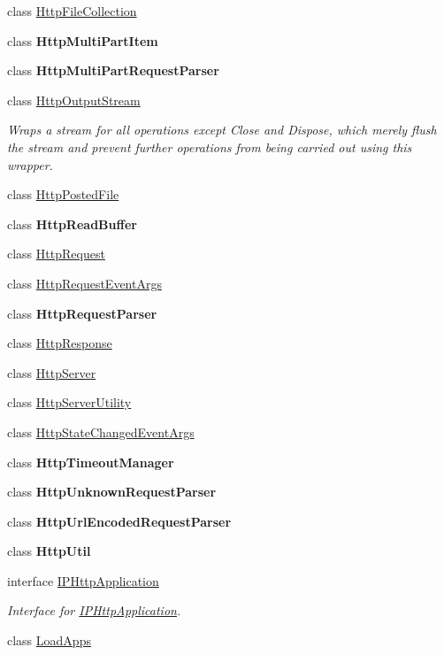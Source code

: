 \begin{DoxyCompactItemize}
class \hyperlink{class_p_http_1_1_http_file_collection}{Http\+File\+Collection}
\item 
class {\bfseries Http\+Multi\+Part\+Item}
\item 
class {\bfseries Http\+Multi\+Part\+Request\+Parser}
\item 
class \hyperlink{class_p_http_1_1_http_output_stream}{Http\+Output\+Stream}
\begin{DoxyCompactList}\small\item\em Wraps a stream for all operations except Close and Dispose, which merely flush the stream and prevent further operations from being carried out using this wrapper. \end{DoxyCompactList}\item 
class \hyperlink{class_p_http_1_1_http_posted_file}{Http\+Posted\+File}
\item 
class {\bfseries Http\+Read\+Buffer}
\item 
class \hyperlink{class_p_http_1_1_http_request}{Http\+Request}
\item 
class \hyperlink{class_p_http_1_1_http_request_event_args}{Http\+Request\+Event\+Args}
\item 
class {\bfseries Http\+Request\+Parser}
\item 
class \hyperlink{class_p_http_1_1_http_response}{Http\+Response}
\item 
class \hyperlink{class_p_http_1_1_http_server}{Http\+Server}
\item 
class \hyperlink{class_p_http_1_1_http_server_utility}{Http\+Server\+Utility}
\item 
class \hyperlink{class_p_http_1_1_http_state_changed_event_args}{Http\+State\+Changed\+Event\+Args}
\item 
class {\bfseries Http\+Timeout\+Manager}
\item 
class {\bfseries Http\+Unknown\+Request\+Parser}
\item 
class {\bfseries Http\+Url\+Encoded\+Request\+Parser}
\item 
class {\bfseries Http\+Util}
\item 
interface \hyperlink{interface_p_http_1_1_i_p_http_application}{I\+P\+Http\+Application}
\begin{DoxyCompactList}\small\item\em Interface for \hyperlink{interface_p_http_1_1_i_p_http_application}{I\+P\+Http\+Application}. \end{DoxyCompactList}\item 
class \hyperlink{class_p_http_1_1_load_apps}{Load\+Apps}

\end{DoxyCompactItemize}
